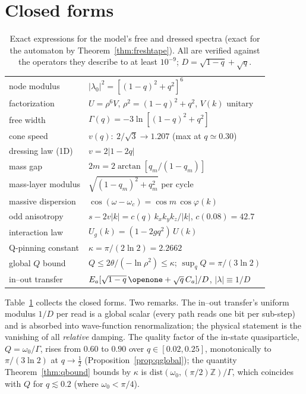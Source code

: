 \documentclass[aps,prd,twocolumn,superscriptaddress,nofootinbib,floatfix]{revtex4-2}
\begin{document}
\section{Closed forms}
\label{app:closedforms}

\begin{table}[!htb]
\caption{Exact expressions for the model's free and dressed spectra
(exact for the automaton by Theorem~\ref{thm:freshtape}). All are
verified against the operators they describe to at least
$10^{-9}$; $D=\sqrt{1-q}+\sqrt q$.}
\label{tab:closed}
\begin{ruledtabular}
\scriptsize
\begin{tabular}{ll}
node modulus & $|\lambda_0|^2=[(1-q)^2+q^2]^6$\\
factorization & $U=\rho^6V$, $\rho^2=(1-q)^2+q^2$, $V(k)$ unitary\\
free width & $\Gamma(q)=-3\ln[(1-q)^2+q^2]$\\
cone speed & $v(q)\colon\ 2/\sqrt3 \to 1.207$ (max at $q\simeq0.30$)\\
dressing law (1D) & $v=2|1-2q|$\\
mass gap & $2m=2\arctan[q_m/(1-q_m)]$\\
mass-layer modulus & $\sqrt{(1-q_m)^2+q_m^2}$ per cycle\\
massive dispersion & $\cos(\omega-\omega_c)=\cos m\,\cos\varphi(k)$\\
odd anisotropy & $s-2v|k|=c(q)\,k_xk_yk_z/|k|$, $c(0.08)=42.7$\\
interaction law & $U_g(k)=(1-2gq^2)\,U(k)$\\
Q-pinning constant & $\kappa=\pi/(2\ln2)=2.2662$\\
global $Q$ bound & $Q\le2\theta/(-\ln\rho^2)\le\kappa$;
$\sup_qQ=\pi/(3\ln2)$\\
in--out transfer & $E_a[\sqrt{1-q}\,\openone+\sqrt q\,C_a]/D$,
$|\lambda|\equiv1/D$
\end{tabular}
\end{ruledtabular}
\end{table}

Table~\ref{tab:closed} collects the closed forms. Two remarks. The
in--out transfer's uniform modulus $1/D$ per read is a global scalar
(every path reads one bit per sub-step) and is absorbed into wave-function
renormalization; the physical statement is the vanishing of all
\emph{relative} damping. The quality factor of the in-state quasiparticle,
$Q=\omega_0/\Gamma$, rises from $0.60$ to $0.90$ over
$q\in[0.02,0.25]$, monotonically to $\pi/(3\ln2)$ at $q\to\tfrac12$
(Proposition~\ref{prop:qglobal}); the quantity
Theorem~\ref{thm:qbound} bounds by
$\kappa$ is $\mathrm{dist}(\omega_0,(\pi/2)\mathbb Z)/\Gamma$, which
coincides with $Q$ for $q\lesssim0.2$ (where $\omega_0<\pi/4$).
\end{document}
